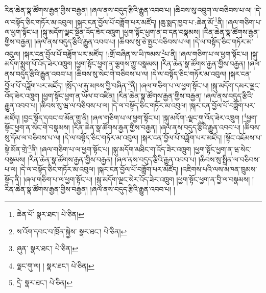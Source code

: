 རིན་ཆེན་སྣ་ཚོགས་རྒྱན་གྱིས་བརྒྱན། །ཞལ་ནས་བདུད་རྩིའི་རྒྱུན་འབབ་པ། །ཆིབས་སུ་འབྲུག་ལ་བཅིབས་པ་ལ། །དེ་ལ་བསྟོད་ཅིང་གཏོར་མ་འབུལ། །སྐར་ངན་བྱོལ་པོ་བཟློག་པར་མཛོད། །ཆུ་སྨད་ཁྱབ་པ་:ཆེན་མོ་\footnote{ཆེན་པོ་  སྣར་ཐང་།  པེ་ཅིན། }ནི། །ཞལ་གཅིག་པ་ལ་ཕྱག་སྟོང་པ། །སྐུ་མདོག་ལྗང་སྔོན་འོད་ཟེར་འཁྲུག །ཕྱག་སྟོང་ཕྱག་ན་བ་དན་བསྣམས། །རིན་ཆེན་སྣ་ཚོགས་རྒྱན་གྱིས་བརྒྱན། །ཞལ་ནས་བདུད་རྩིའི་རྒྱུན་འབབ་པ། །ཆིབས་སུ་ཅེ་སྤྱང་བཅིབས་པ་ལ། །དེ་ལ་བསྟོད་ཅིང་གཏོར་མ་འབུལ། །སྐར་ངན་བྱོལ་པོ་བཟློག་པར་མཛོད། །:གྲོ་བཞིན་ས་ཡི་ཁམས་\footnote{ས་འོག་དབང་བ་ཁྲོན་སྐྱེས་  སྣར་ཐང་།  པེ་ཅིན། }པ་ནི། །ཞལ་གཅིག་པ་ལ་ཕྱག་སྟོང་པ། །སྐུ་མདོག་སྨུག་པོ་འོད་ཟེར་འཁྲུག །ཕྱག་སྟོང་ཕྱག་ན་ལྕགས་ཀྱུ་བསྣམས། །རིན་ཆེན་སྣ་ཚོགས་རྒྱན་གྱིས་བརྒྱན། །ཞལ་ནས་བདུད་རྩིའི་རྒྱུན་འབབ་པ། །ཆིབས་སུ་སེང་གེ་བཅིབས་པ་ལ། །དེ་ལ་བསྟོད་ཅིང་གཏོར་མ་འབུལ། །སྐར་ངན་བྱོལ་པོ་བཟློག་པར་མཛོད། །སྲོད་ལ་རྐུ་མཁས་བྱི་བཞིན་\footnote{ཞུན་  སྣར་ཐང་།  པེ་ཅིན། }ནི། །ཞལ་གཅིག་པ་ལ་ཕྱག་སྟོང་པ། །སྐུ་མདོག་དམར་ལྗང་འོད་ཟེར་འཁྲུག །ཕྱག་སྟོང་ཕྱག་ན་ཡོལ་བ་འཛིན། །རིན་ཆེན་སྣ་ཚོགས་རྒྱན་གྱིས་བརྒྱན། །ཞལ་ནས་བདུད་རྩིའི་རྒྱུན་འབབ་པ། །ཆིབས་སུ་ཝ་ལ་བཅིབས་པ་ལ། །དེ་ལ་བསྟོད་ཅིང་གཏོར་མ་འབུལ། །སྐར་ངན་བྱོལ་པོ་བཟློག་པར་མཛོད། །བྱང་སྟོད་དབང་བ་མོན་གྲུ་ནི། །ཞལ་གཅིག་པ་ལ་ཕྱག་སྟོང་པ། །སྐུ་མདོག་:ལྗང་གུ་འོད་ཟེར་འཁྲུག །\footnote{ལྗང་གུ་ལ། །  སྣར་ཐང་།  པེ་ཅིན། }ཕྱག་སྟོང་ཕྱག་ན་སེང་གེ་བསྣམས། །རིན་ཆེན་སྣ་ཚོགས་རྒྱན་གྱིས་བརྒྱན། །ཞལ་ནས་བདུད་རྩིའི་རྒྱུན་འབབ་པ། །ཆིབས་སུ་དོམ་ལ་བཅིབས་པ་ལ། །དེ་ལ་བསྟོད་ཅིང་གཏོར་མ་འབུལ། །སྐར་ངན་བྱོལ་པོ་བཟློག་པར་མཛོད། །སྟོང་འཇོམས་པ་སྟེ་མོན་གྲེ་\footnote{དྲེ་  སྣར་ཐང་།  པེ་ཅིན། }ནི། །ཞལ་གཅིག་པ་ལ་ཕྱག་སྟོང་པ། །སྐུ་མདོག་མཐིང་ག་འོད་ཟེར་འཁྲུག །ཕྱག་སྟོང་ཕྱག་ན་ཝ་སེང་བསྣམས། །རིན་ཆེན་སྣ་ཚོགས་རྒྱན་གྱིས་བརྒྱན། །ཞལ་ནས་བདུད་རྩིའི་རྒྱུན་འབབ་པ། །ཆིབས་སུ་སྤྲིན་ལ་བཅིབས་པ་ལ། །དེ་ལ་བསྟོད་ཅིང་གཏོར་མ་འབུལ། །སྐར་ངན་བྱོལ་པོ་བཟློག་པར་མཛོད། །འཇིགས་པའི་ལས་མཁན་ཁྲུམས་སྟོད་ནི། །ཞལ་གཅིག་པ་ལ་ཕྱག་སྟོང་པ། །སྐུ་མདོག་ལྗང་སེར་འོད་ཟེར་འཁྲུག །ཕྱག་སྟོང་ཕྱག་ན་བྱི་ལ་བསྣམས། །རིན་ཆེན་སྣ་ཚོགས་རྒྱན་གྱིས་བརྒྱན། །ཞལ་ནས་བདུད་རྩིའི་རྒྱུན་འབབ་པ། །
